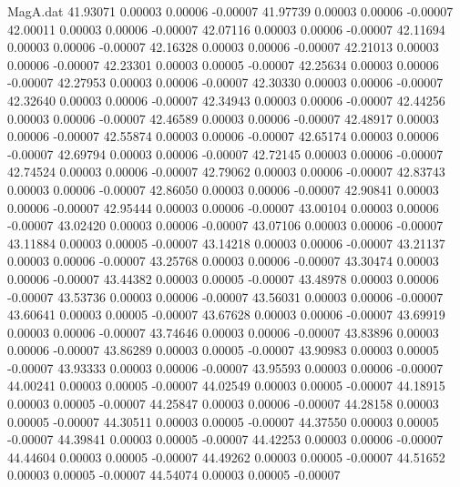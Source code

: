 \begin{filecontents}{MagA.dat}
  41.93071    0.00003    0.00006   -0.00007
  41.97739    0.00003    0.00006   -0.00007
  42.00011    0.00003    0.00006   -0.00007
  42.07116    0.00003    0.00006   -0.00007
  42.11694    0.00003    0.00006   -0.00007
  42.16328    0.00003    0.00006   -0.00007
  42.21013    0.00003    0.00006   -0.00007
  42.23301    0.00003    0.00005   -0.00007
  42.25634    0.00003    0.00006   -0.00007
  42.27953    0.00003    0.00006   -0.00007
  42.30330    0.00003    0.00006   -0.00007
  42.32640    0.00003    0.00006   -0.00007
  42.34943    0.00003    0.00006   -0.00007
  42.44256    0.00003    0.00006   -0.00007
  42.46589    0.00003    0.00006   -0.00007
  42.48917    0.00003    0.00006   -0.00007
  42.55874    0.00003    0.00006   -0.00007
  42.65174    0.00003    0.00006   -0.00007
  42.69794    0.00003    0.00006   -0.00007
  42.72145    0.00003    0.00006   -0.00007
  42.74524    0.00003    0.00006   -0.00007
  42.79062    0.00003    0.00006   -0.00007
  42.83743    0.00003    0.00006   -0.00007
  42.86050    0.00003    0.00006   -0.00007
  42.90841    0.00003    0.00006   -0.00007
  42.95444    0.00003    0.00006   -0.00007
  43.00104    0.00003    0.00006   -0.00007
  43.02420    0.00003    0.00006   -0.00007
  43.07106    0.00003    0.00006   -0.00007
  43.11884    0.00003    0.00005   -0.00007
  43.14218    0.00003    0.00006   -0.00007
  43.21137    0.00003    0.00006   -0.00007
  43.25768    0.00003    0.00006   -0.00007
  43.30474    0.00003    0.00006   -0.00007
  43.44382    0.00003    0.00005   -0.00007
  43.48978    0.00003    0.00006   -0.00007
  43.53736    0.00003    0.00006   -0.00007
  43.56031    0.00003    0.00006   -0.00007
  43.60641    0.00003    0.00005   -0.00007
  43.67628    0.00003    0.00006   -0.00007
  43.69919    0.00003    0.00006   -0.00007
  43.74646    0.00003    0.00006   -0.00007
  43.83896    0.00003    0.00006   -0.00007
  43.86289    0.00003    0.00005   -0.00007
  43.90983    0.00003    0.00005   -0.00007
  43.93333    0.00003    0.00006   -0.00007
  43.95593    0.00003    0.00006   -0.00007
  44.00241    0.00003    0.00005   -0.00007
  44.02549    0.00003    0.00005   -0.00007
  44.18915    0.00003    0.00005   -0.00007
  44.25847    0.00003    0.00006   -0.00007
  44.28158    0.00003    0.00005   -0.00007
  44.30511    0.00003    0.00005   -0.00007
  44.37550    0.00003    0.00005   -0.00007
  44.39841    0.00003    0.00005   -0.00007
  44.42253    0.00003    0.00006   -0.00007
  44.44604    0.00003    0.00005   -0.00007
  44.49262    0.00003    0.00005   -0.00007
  44.51652    0.00003    0.00005   -0.00007
  44.54074    0.00003    0.00005   -0.00007

\end{filecontents}
